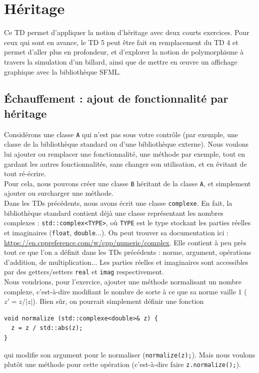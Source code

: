 \documentclass{book}
\newcommand{\inline}[1]{\texttt{#1}}
\begin{document}
\setcounter{chapter}{3}

\chapter{Héritage}

Ce TD permet d'appliquer la notion d'héritage avec deux courts exercices. Pour ceux qui sont en avance, le TD 5 peut être fait en remplacement du TD 4 et permet d'aller plus en profondeur, et d'explorer la notion de polymorphisme à travers la simulation d'un billard, ainsi que de mettre en \oe uvre un affichage graphique avec la bibliothèque SFML.

\section{Échauffement : ajout de fonctionnalité par héritage}

Considérons une classe \inline{A} qui n'est pas sous votre contrôle (par exemple, une classe de la bibliothèque standard ou d'une bibliothèque externe). Nous voulons lui ajouter ou remplacer une fonctionnalité, une méthode par exemple, tout en gardant les autres fonctionnalités, sans changer son utilisation, et en évitant de tout ré-écrire.\\

Pour cela, nous pouvons créer une classe \inline{B} héritant de la classe \inline{A}, et simplement ajouter ou surcharger une méthode.\\

Dans les TDs précédents, nous avons écrit une classe \inline{complexe}. En fait, la bibliothèque standard contient déjà une classe représentant les nombres complexes : \inline{std::complex<TYPE>}, où \inline{TYPE} est le type stockant les parties réelles et imaginaires (\inline{float}, \inline{double}...). On peut trouver sa documentation ici : \url{https://en.cppreference.com/w/cpp/numeric/complex}. Elle contient à peu près tout ce que l'on a définit dans les TDs précédents : norme, argument, opérations d'addition, de multiplication... Les parties réelles et imaginaires sont accessibles par des getters/setters \inline{real} et \inline{imag} respectivement.\\

Nous voudrions, pour l'exercice, ajouter une méthode normalisant un nombre complexe, c'est-à-dire modifiant le nombre de sorte à ce que sa norme vaille $1$ ($z'=z/|z|$). Bien sûr, on pourrait simplement définir une fonction
\begin{verbatim}
void normalize (std::complexe<double>& z) {
  z = z / std::abs(z);
}
\end{verbatim}
qui modifie son argument pour le normaliser (\inline{normalize(z);}). Mais nous voulons plutôt une méthode pour cette opération (c'est-à-dire faire \inline{z.normalize();}).\\
\end{document}

